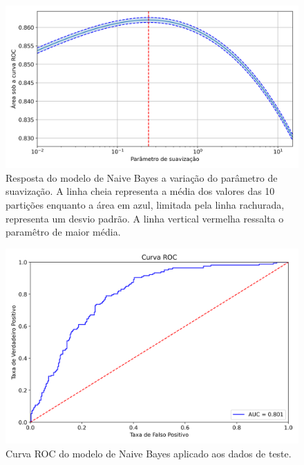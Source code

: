 \begin{figure}[h]
\begin{center} {
    \begin{center}
    \includegraphics[scale=0.65]{images/nb_grid.png}
    \caption{Resposta do modelo de Naive Bayes a variação do parâmetro de suavização.
             A linha cheia representa a média dos valores das 10 partições
             enquanto a área em azul, limitada pela linha rachurada, representa um desvio padrão.
             A linha vertical vermelha ressalta o paramêtro de maior média.}
    \label{fig:nb_grid}
    \end{center}
}
\end{center}
\end{figure}

\begin{figure}[h]
\begin{center} {
    \begin{center}
    \includegraphics[scale=0.65]{images/nb_roc.png}
    \caption{Curva ROC do modelo de Naive Bayes aplicado aos dados de teste.}
    \label{fig:nb_roc}
    \end{center}
}
\end{center}
\end{figure}


